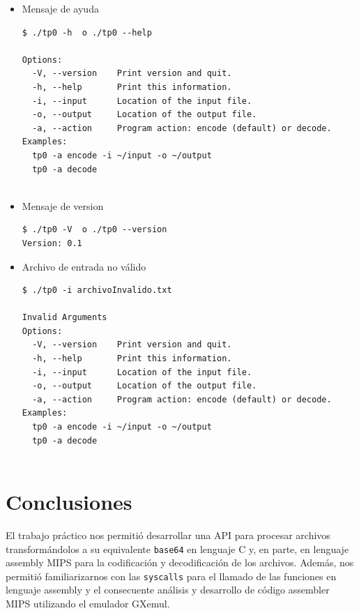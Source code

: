 \documentclass[11pt,a4paper]{article}
\begin{document}
\begin{itemize}
    \item Mensaje de ayuda\\
    
\begin{lstlisting}
$ ./tp0 -h  o ./tp0 --help

Options:
  -V, --version    Print version and quit.
  -h, --help       Print this information.
  -i, --input      Location of the input file.
  -o, --output     Location of the output file.
  -a, --action     Program action: encode (default) or decode.
Examples:
  tp0 -a encode -i ~/input -o ~/output
  tp0 -a decode


\end{lstlisting}     
     
	\item Mensaje de version\\

            \begin{lstlisting}
$ ./tp0 -V  o ./tp0 --version
Version: 0.1
             \end{lstlisting}  
         
         
    \item Archivo de entrada no válido
            \begin{lstlisting}
$ ./tp0 -i archivoInvalido.txt

Invalid Arguments
Options:
  -V, --version    Print version and quit.
  -h, --help       Print this information.
  -i, --input      Location of the input file.
  -o, --output     Location of the output file.
  -a, --action     Program action: encode (default) or decode.
Examples:
  tp0 -a encode -i ~/input -o ~/output
  tp0 -a decode


             \end{lstlisting}  

\end{itemize}


\newpage

\section{Conclusiones}

El trabajo práctico nos permitió desarrollar una API para procesar archivos transformándolos a su equivalente \texttt{base64} en lenguaje C y, en parte, en lenguaje assembly MIPS para la codificación y decodificación de los archivos. Además, nos permitió familiarizarnos con las \texttt{syscalls} para el llamado de las funciones en lenguaje assembly y el consecuente análisis y desarrollo de código assembler MIPS utilizando el emulador GXemul.
\end{document}
